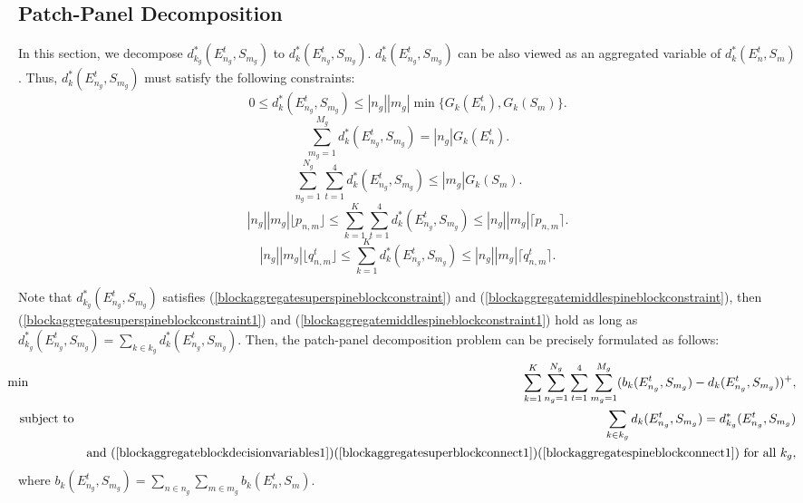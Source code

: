 \documentclass[letterpaper,twocolumn,10pt]{article}
\begin{document}
\subsection{Patch-Panel Decomposition}
In this section, we decompose $d^*_{k_g}(E_{n_g}^t, S_{m_g})$ to $d^*_{k}(E_{n_g}^t, S_{m_g})$. $d^*_{k}(E_{n_g}^t, S_{m_g})$ can be also viewed as an aggregated variable of $d^*_{k}(E_n^t, S_m)$. Thus, $d^*_{k}(E_{n_g}^t, S_{m_g})$ must satisfy the following constraints:
\begin{equation}\label{blockaggregateblockdecisionvariables1}
0\leq d^*_{k}(E_{n_g}^t, S_{m_g})\leq |n_g||m_g|\min\{G_k(E_n^t), G_k(S_m)\}.
\end{equation}
\begin{equation}\label{blockaggregatesuperblockconnect1}
\sum_{m_g=1}^{M_g}d^*_{k}(E_{n_g}^t, S_{m_g}) = |n_g|G_k(E_n^t).
\end{equation}
\begin{equation}\label{blockaggregatespineblockconnect1}
\sum_{n_g=1}^{N_g}\sum_{t=1}^4d^*_{k}(E_{n_g}^t, S_{m_g}) \leq |m_g|G_k(S_m).
\end{equation}
\begin{equation}\label{blockaggregatesuperspineblockconstraint1}
|n_g||m_g|\lfloor p_{n,m}\rfloor\leq \sum_{k=1}^{K}\sum_{t=1}^4 d^*_{k}(E_{n_g}^t, S_{m_g})\leq |n_g||m_g|\lceil p_{n,m}\rceil.
\end{equation}
\begin{equation}\label{blockaggregatemiddlespineblockconstraint1}
|n_g||m_g|\lfloor q^t_{n,m}\rfloor\leq \sum_{k=1}^{K}d^*_{k}(E_{n_g}^t, S_{m_g})\leq |n_g||m_g|\lceil q^t_{n,m}\rceil.
\end{equation}

Note that $d^*_{k_g}(E_{n_g}^t, S_{m_g})$ satisfies (\ref{blockaggregatesuperspineblockconstraint}) and (\ref{blockaggregatemiddlespineblockconstraint}), then (\ref{blockaggregatesuperspineblockconstraint1}) and (\ref{blockaggregatemiddlespineblockconstraint1}) hold as long as $d^*_{k_g}(E_{n_g}^t, S_{m_g})=\sum_{k\in k_g}d^*_{k}(E_{n_g}^t, S_{m_g})$. Then, the patch-panel decomposition problem can be precisely formulated as follows:
\begin{eqnarray}\label{patchpaneldecomposition}
&\hspace{-4mm}\min&\hspace{-9mm}\sum_{k=1}^K\sum_{n_g=1}^{N_g}\sum_{t=1}^4\sum_{m_g=1}^{M_g}(b_k(E_{n_g}^t,S_{m_g})-d_k(E_{n_g}^t,S_{m_g}))^+,\nonumber\\
&\text{subject to}& \sum_{k\in k_g}d_k(E_{n_g}^t,S_{m_g})=d^*_{k_g}(E_{n_g}^t, S_{m_g})\\
&&\text{and }(\ref{blockaggregateblockdecisionvariables1})(\ref{blockaggregatesuperblockconnect1})(\ref{blockaggregatespineblockconnect1})\text{ for all }k_g,\nonumber
\end{eqnarray}
where $b_k(E_{n_g}^t, S_{m_g})=\sum_{n\in n_g}\sum_{m\in m_g}b_k(E_n^t, S_m)$.
\end{document}
